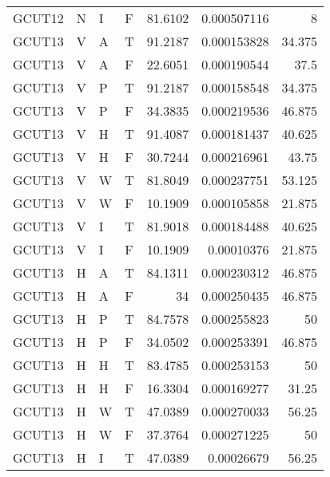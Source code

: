 \begin{longtable}{llllrrr}
    GCUT12   & N         & I         & F          & 81.6102    & 0.000507116 & 8        \\
    GCUT13   & V         & A         & T          & 91.2187    & 0.000153828 & 34.375   \\
    GCUT13   & V         & A         & F          & 22.6051    & 0.000190544 & 37.5     \\
    GCUT13   & V         & P         & T          & 91.2187    & 0.000158548 & 34.375   \\
    GCUT13   & V         & P         & F          & 34.3835    & 0.000219536 & 46.875   \\
    GCUT13   & V         & H         & T          & 91.4087    & 0.000181437 & 40.625   \\
    GCUT13   & V         & H         & F          & 30.7244    & 0.000216961 & 43.75    \\
    GCUT13   & V         & W         & T          & 81.8049    & 0.000237751 & 53.125   \\
    GCUT13   & V         & W         & F          & 10.1909    & 0.000105858 & 21.875   \\
    GCUT13   & V         & I         & T          & 81.9018    & 0.000184488 & 40.625   \\
    GCUT13   & V         & I         & F          & 10.1909    & 0.00010376  & 21.875   \\
    GCUT13   & H         & A         & T          & 84.1311    & 0.000230312 & 46.875   \\
    GCUT13   & H         & A         & F          & 34         & 0.000250435 & 46.875   \\
    GCUT13   & H         & P         & T          & 84.7578    & 0.000255823 & 50       \\
    GCUT13   & H         & P         & F          & 34.0502    & 0.000253391 & 46.875   \\
    GCUT13   & H         & H         & T          & 83.4785    & 0.000253153 & 50       \\
    GCUT13   & H         & H         & F          & 16.3304    & 0.000169277 & 31.25    \\
    GCUT13   & H         & W         & T          & 47.0389    & 0.000270033 & 56.25    \\
    GCUT13   & H         & W         & F          & 37.3764    & 0.000271225 & 50       \\
    GCUT13   & H         & I         & T          & 47.0389    & 0.00026679  & 56.25    \\

\end{longtable}
